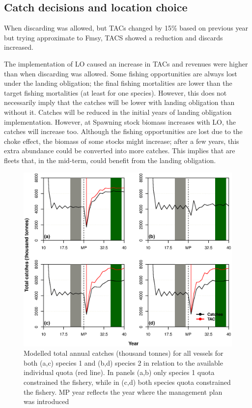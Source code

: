 \documentclass[12pt,oneline,a4paper,numbib]{ouparticle}
\numberwithin{equation}{subsection} %
\begin{document}
\subsection{Catch decisions and location choice}
\label{sec3.1}
When discarding was allowed, but TACs changed by 15\% based on previous year but trying approximate to Fmsy, TACS showed a reduction and discards increased. 

The implementation of LO caused an increase in TACs and revenues were higher than when discarding was allowed. Some fishing opportunities are always lost under the landing obligation; the final fishing mortalities are lower than the target fishing mortalities (at least for one species). However, this does not necessarily imply that the catches will be lower with landing obligation than without it. Catches will be reduced in the initial years of landing obligation implementation. However, at Spawning stock biomass increases with LO, the catches will increase too. Although the fishing opportunities are lost due to the choke effect, the biomass of some stocks might increase; after a few years, this extra abundance could be converted into more catches. This implies that are fleets that, in the mid-term, could benefit from the landing obligation.

\begin{figure}[!ht]
\centering
\includegraphics[width=\textwidth]{Figures/Catches.eps} 
\caption{Modelled total annual catches (thousand tonnes) for all vessels for both (a,c) species 1 and (b,d) species 2 in relation to the available individual quota (red line). In panels (a,b) only species 1 quota constrained the fishery, while in (c,d) both species quota constrained the fishery. MP year reflects the year where the management plan was introduced}
\end{figure}
\end{document}
